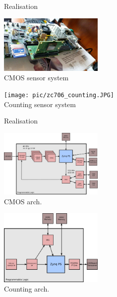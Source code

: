 \documentclass[10pt]{beamer}
\begin{document}
    \begin{frame}{Realisation}

        \begin{minipage}{.5\textwidth}
            \centering
            \includegraphics[width=5cm]{pic/zc706_cmv_4000.jpg}\\
            \caption{CMOS sensor system}
        \end{minipage}%
        \begin{minipage}{0.5\textwidth}
            \centering
            \texttt{[image: pic/zc706\_counting.JPG]}\\
            \caption{Counting sensor system}
        \end{minipage}

    \end{frame}

    \begin{frame}{Realisation}

        \begin{minipage}{.5\textwidth}
            \centering
            \includegraphics[width=5cm]{pic/cmv4000_arch.png}\\
            \caption{CMOS arch.}
        \end{minipage}%
        \begin{minipage}{0.5\textwidth}
            \centering
            \includegraphics[width=5cm]{pic/silicon_arch.png}\\
            \caption{Counting arch.}
        \end{minipage}

    \end{frame}
\end{document}
